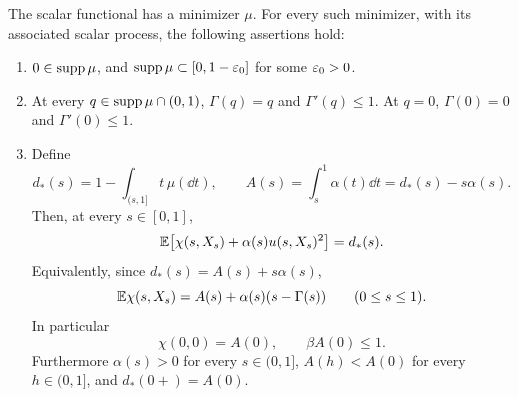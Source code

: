 \begin{proposition}
\label{static-prop:scalar-minimizer}
The scalar functional has a minimizer $\mu$. For every such minimizer,
with its associated scalar process, the following assertions hold:
\begin{enumerate}[label=\textup{(\roman*)}]
 \item $0\in\operatorname{supp}\mu$, and $\operatorname{supp}\mu\subset[0,1-\varepsilon_0]$ for some
       $\varepsilon_0>0$.
 \item At every $q\in\operatorname{supp}\mu\cap(0,1)$,
       $\Gamma(q)=q$ and $\Gamma'(q)\le1$. At $q=0$,
       $\Gamma(0)=0$ and $\Gamma'(0)\le1$.
 \item Define
 \begin{equation}\label{static-eq:scalar-A-d-definitions}
   d_*(s)=1-\int_{(s,1]}t\,\mu(\dd t),\qquad
   A(s)=\int_s^1\alpha(t)\dd t=d_*(s)-s\alpha(s).
 \end{equation}
 Then, at every $s\in[0,1]$,
 \begin{equation}\label{static-eq:scalar-stationarity-identity}
   \mathbb E\bigl[\chi(s,X_s)+\alpha(s)u(s,X_s)^2\bigr]=d_*(s).
 \end{equation}
 Equivalently, since $d_*(s)=A(s)+s\alpha(s)$,
 \begin{equation}\label{eq:scalar-stationarity}
   \mathbb E\chi(s,X_s)=A(s)+\alpha(s)(s-\Gamma(s))
       \qquad(0\le s\le1).
 \end{equation}
 In particular
 \begin{equation}\label{static-eq:scalar-susceptibility}
   \chi(0,0)=A(0),\qquad \beta A(0)\le1.
 \end{equation}
 Furthermore $\alpha(s)>0$ for every $s\in(0,1]$,
 $A(h)<A(0)$ for every $h\in(0,1]$, and $d_*(0+)=A(0)$.
\end{enumerate}
\end{proposition}

